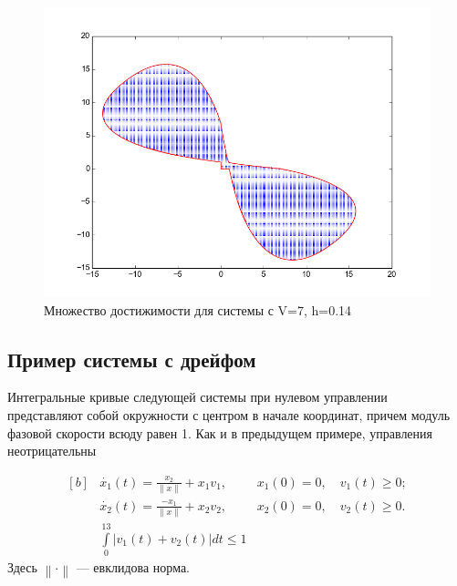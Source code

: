 \begin{figure}
\begin{minipage}[h]{0.47\linewidth}
  \noindent \hfil
  \includegraphics[width=1\linewidth]{img/figure_v_7_h_014.png}
  \hfil \caption{Множество достижимости для системы с V=7, h=0.14}
  \label{fig:v5h0.2}
\end{minipage}
\end{figure}

\subsection{Пример системы с дрейфом}
\label{sec:swd}

Интегральные кривые следующей системы при нулевом управлении
представляют собой окружности с центром в начале координат, причем
модуль фазовой скорости всюду равен 1. Как и в предыдущем примере,
управления неотрицательны

\begin{equation*}
  \begin{aligned}[b]
    &\dot{x_1}(t) = \frac{x_2}{\left\|x\right\|} + x_1v_1, &x_1(0) =
    0,\quad v_1(t) \ge 0;\\
    &\dot{x_2}(t) = \frac{-x_1}{\left\|x\right\|} + x_2v_2, &x_2(0)
    = 0,\quad v_2(t) \ge 0.\\
    &\int\limits_0^{13} |v_1(t)+ v_2(t)| dt \le 1
  \end{aligned}
\end{equation*}
Здесь $\left\| \cdot \right\|$ --- евклидова норма.


